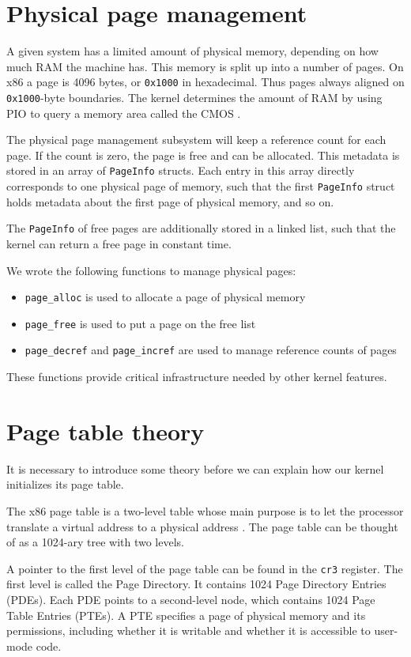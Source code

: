 \documentclass{report}
\begin{document}
\section{Physical page management}
A given system has a limited amount of physical memory, depending on how much
RAM the machine has. This memory is split up into a number of pages. On x86 a
page is 4096 bytes, or \texttt{0x1000} in hexadecimal. Thus pages always aligned on
\texttt{0x1000}-byte boundaries. The kernel determines the amount of RAM by using
PIO to query a memory area called the CMOS \cite{cmos}.

The physical page management subsystem will keep a reference count for each
page. If the count is zero, the page is free and can be allocated. This
metadata is stored in an array of \texttt{PageInfo} structs. Each entry in
this array directly corresponds to one physical page of memory, such that the
first \texttt{PageInfo} struct holds metadata about the first page of physical
memory, and so on.

The \texttt{PageInfo} of free pages are additionally stored in a linked list,
such that the kernel can return a free page in constant time.

We wrote the following functions to manage physical pages:
\begin{itemize}
\item \texttt{page\_alloc} is used to allocate a page of physical memory
\item \texttt{page\_free} is used to put a page on the free list
\item \texttt{page\_decref} and \texttt{page\_incref} are used to manage
reference counts of pages
\end{itemize}
These functions provide critical infrastructure needed by other kernel
features.



\section{Page table theory}
It is necessary to introduce some theory before we can explain how our kernel
initializes its page table.

The x86 page table is a two-level table whose main purpose is to let the
processor translate a virtual address to a physical address
\cite{manual8086ch5}. The page table can be thought of as a 1024-ary tree with
two levels. 

A pointer to the first level of the page table can be found in the
\texttt{cr3} register. The first level is called the Page Directory. It
contains 1024 Page Directory Entries (PDEs). Each PDE points to a
second-level node, which contains 1024 Page Table Entries (PTEs). 
A PTE specifies a page of physical memory and its permissions, including
whether it is writable and whether it is accessible to user-mode code.
\end{document}
